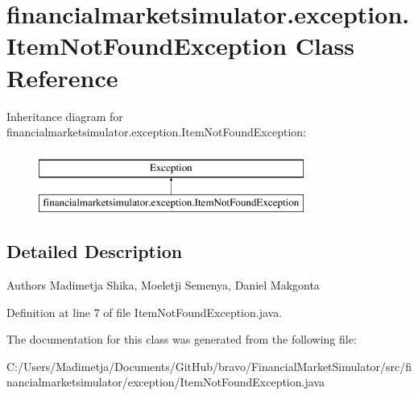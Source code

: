 \hypertarget{classfinancialmarketsimulator_1_1exception_1_1_item_not_found_exception}{\section{financialmarketsimulator.\+exception.\+Item\+Not\+Found\+Exception Class Reference}
\label{classfinancialmarketsimulator_1_1exception_1_1_item_not_found_exception}
}
Inheritance diagram for financialmarketsimulator.\+exception.\+Item\+Not\+Found\+Exception\+:\begin{figure}[H]
\begin{center}
\leavevmode
\includegraphics[height=2.000000cm]{classfinancialmarketsimulator_1_1exception_1_1_item_not_found_exception}
\end{center}
\end{figure}


\subsection{Detailed Description}
\begin{DoxyAuthor}{Authors}
Madimetja Shika, Moeletji Semenya, Daniel Makgonta 
\end{DoxyAuthor}


Definition at line 7 of file Item\+Not\+Found\+Exception.\+java.



The documentation for this class was generated from the following file\+:\begin{DoxyCompactItemize}
\item 
C\+:/\+Users/\+Madimetja/\+Documents/\+Git\+Hub/bravo/\+Financial\+Market\+Simulator/src/financialmarketsimulator/exception/Item\+Not\+Found\+Exception.\+java\end{DoxyCompactItemize}
